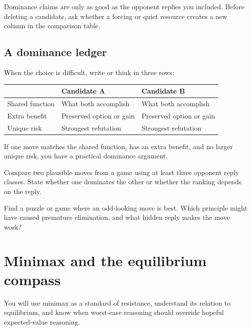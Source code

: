 \begin{warningbox}[title={The invisible-column error}]
Dominance claims are only as good as the opponent replies you included. Before deleting a candidate, ask whether a forcing or quiet resource creates a new column in the comparison table.
\end{warningbox}

\section{A dominance ledger}
When the choice is difficult, write or think in three rows:

\begin{center}
\begin{tabularx}{.9\textwidth}{p{}YY}
\toprule
& \textbf{Candidate A} & \textbf{Candidate B}\\
\midrule
Shared function & What both accomplish & What both accomplish\\
Extra benefit & Preserved option or gain & Preserved option or gain\\
Unique risk & Strongest refutation & Strongest refutation\\
\bottomrule
\end{tabularx}
\end{center}

If one move matches the shared function, has an extra benefit, and no larger unique risk, you have a practical dominance argument.

\begin{exercise}
Compare two plausible moves from a game using at least three opponent reply classes. State whether one dominates the other or whether the ranking depends on the reply.
\end{exercise}

\begin{exercise}
Find a puzzle or game where an odd-looking move is best. Which principle might have caused premature elimination, and what hidden reply makes the move work?
\end{exercise}


\chapter{Minimax and the equilibrium compass}
\begin{learningbox}
You will use minimax as a standard of resistance, understand its relation to equilibrium, and know when worst-case reasoning should override hopeful expected-value reasoning.
\end{learningbox}

